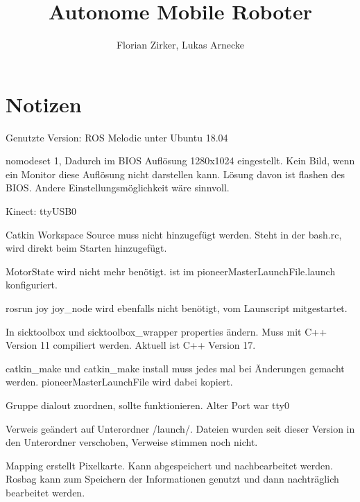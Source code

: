\documentclass{scrartcl}%
\begin{document}
\titlehead{AMR}%
\subject{Projektbericht}%
\title{Autonome Mobile Roboter}%
\author{Florian Zirker, Lukas Arnecke}%
\publishers{Prof. Dr. Thomas Ihme}%
\maketitle%
\tableofcontents

\section{Notizen}
Genutzte Version: ROS Melodic unter Ubuntu 18.04

nomodeset 1, Dadurch im BIOS Auflösung 1280x1024 eingestellt. Kein Bild, wenn ein Monitor diese Auflösung nicht darstellen kann. Lösung davon ist flashen des BIOS. Andere Einstellungsmöglichkeit wäre sinnvoll.

Kinect: ttyUSB0

Catkin Workspace Source muss nicht hinzugefügt werden. Steht in der bash.rc, wird direkt beim Starten hinzugefügt.

MotorState wird nicht mehr benötigt. ist im pioneerMasterLaunchFile.launch konfiguriert.

rosrun joy joy\_node wird ebenfalls nicht benötigt, vom Launscript mitgestartet.

In sicktoolbox und sicktoolbox\_wrapper properties ändern. Muss mit C++ Version 11 compiliert werden. Aktuell ist C++ Version 17.

catkin\_make und catkin\_make install muss jedes mal bei Änderungen gemacht werden. pioneerMasterLaunchFile wird dabei kopiert.

Gruppe dialout zuordnen, sollte funktionieren. Alter Port war tty0

Verweis geändert auf Unterordner /launch/. Dateien wurden seit dieser Version in den Unterordner verschoben, Verweise stimmen noch nicht.

Mapping erstellt Pixelkarte. Kann abgespeichert und nachbearbeitet werden. Rosbag kann zum Speichern der Informationen genutzt und dann nachträglich bearbeitet werden.
\end{document}
